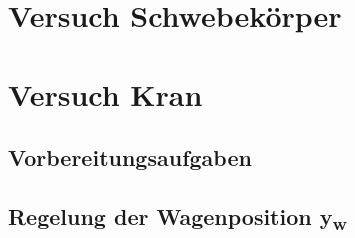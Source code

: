 \documentclass[10pt]{scrartcl}
\begin{document}
\section{Versuch Schwebekörper}

\section{Versuch Kran}
\subsection{Vorbereitungsaufgaben}
\subsection{Regelung der Wagenposition y\textsubscript{w}}
\end{document}
